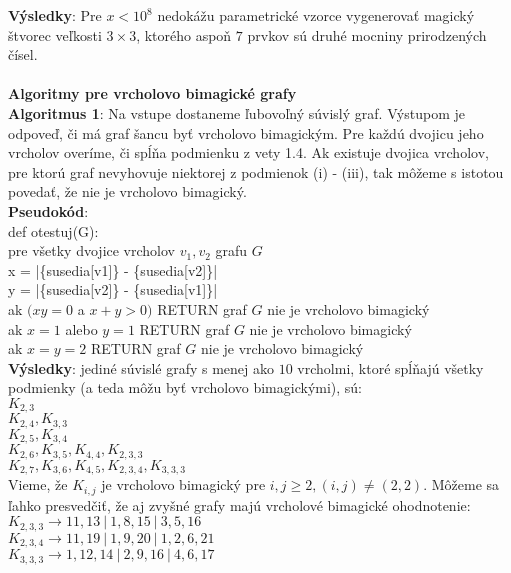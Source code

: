 \documentclass[12pt]{article}
\begin{document}
\textbf{Výsledky}: Pre $x < 10^8$ nedokážu parametrické vzorce vygenerovať magický štvorec veľkosti $3 \times 3$, ktorého aspoň $7$ prvkov sú druhé mocniny prirodzených čísel. \\\\

\textbf{Algoritmy pre vrcholovo bimagické grafy} \\
 
\textbf{Algoritmus 1}: Na vstupe dostaneme ľubovoľný súvislý graf. Výstupom je odpoveď, či má graf šancu byť vrcholovo bimagickým. Pre každú dvojicu jeho vrcholov overíme, či spĺňa podmienku z vety 1.4. Ak existuje dvojica vrcholov, pre ktorú graf nevyhovuje niektorej z podmienok (i) - (iii), tak môžeme s istotou povedať, že nie je vrcholovo bimagický. \\

\textbf{Pseudokód}: \\
def otestuj(G): \\
pre všetky dvojice vrcholov $v_1, v_2$ grafu $G$ \\
x = |\{susedia[v1]\} - \{susedia[v2]\}| \\
y = |\{susedia[v2]\} - \{susedia[v1]\}| \\
ak $(xy = 0$ a $x+y > 0)$ RETURN graf $G$ nie je vrcholovo bimagický \\
ak $x = 1$ alebo $y = 1$ RETURN graf $G$ nie je vrcholovo bimagický \\
ak $x = y = 2$ RETURN graf $G$ nie je vrcholovo bimagický \\

\textbf{Výsledky}: jediné súvislé grafy s menej ako $10$ vrcholmi, ktoré spĺňajú všetky podmienky (a teda môžu byť vrcholovo bimagickými), sú: \\
$K_{2,3}$ \\
$K_{2,4}, K_{3,3}$ \\
$K_{2,5}, K_{3,4}$ \\
$K_{2,6}, K_{3,5}, K_{4,4}, K_{2,3,3}$ \\
$K_{2,7}, K_{3,6}, K_{4,5}, K_{2,3,4}, K_{3,3,3}$ \\

Vieme, že $K_{i,j}$ je vrcholovo bimagický pre $i,j \geq 2, (i,j) \neq (2,2)$. Môžeme sa ľahko presvedčiť, že aj zvyšné grafy majú vrcholové bimagické ohodnotenie: \\
$K_{2,3,3} \rightarrow 11, 13 ~|~ 1, 8, 15 ~|~ 3, 5, 16$ \\
$K_{2,3,4} \rightarrow 11, 19 ~|~ 1, 9, 20 ~|~ 1, 2, 6, 21$ \\
$K_{3,3,3} \rightarrow 1, 12, 14 ~|~ 2, 9, 16 ~|~ 4, 6, 17$ \\\\
\end{document}
